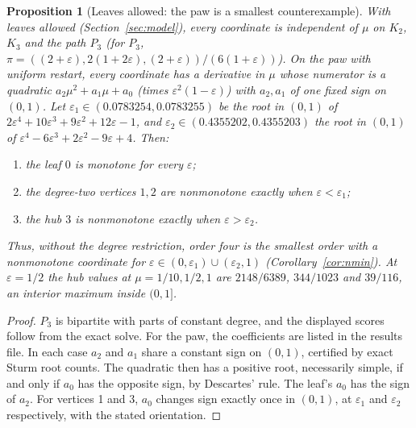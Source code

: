\documentclass[11pt,a4paper]{article}
\newtheorem{proposition}[theorem]{Proposition}
\theoremstyle{definition}\newtheorem{conjecture}{Conjecture}
\theoremstyle{remark}\newtheorem{remark}[theorem]{Remark}
\newcommand{\eps}{\varepsilon}
\begin{document}
\begin{proposition}[Leaves allowed: the paw is a smallest counterexample]\label{prop:paw}
With leaves allowed (Section~\ref{sec:model}), every coordinate is independent of $\mu$ on $K_2$, $K_3$ and the path $P_3$ (for $P_3$, $\pi=((2+\eps),2(1+2\eps),(2+\eps))/(6(1+\eps))$). On the paw with uniform restart, every coordinate has a derivative in $\mu$ whose numerator is a quadratic $a_2\mu^2+a_1\mu+a_0$ (times $\eps^2(1-\eps)$) with $a_2,a_1$ of one fixed sign on $(0,1)$. Let $\eps_1\in(0.0783254,0.0783255)$ be the root in $(0,1)$ of $2\eps^4+10\eps^3+9\eps^2+12\eps-1$, and $\eps_2\in(0.4355202,0.4355203)$ the root in $(0,1)$ of $\eps^4-6\eps^3+2\eps^2-9\eps+4$. Then:
\begin{enumerate}
 \item the leaf $0$ is monotone for every $\eps$;
 \item the degree-two vertices $1,2$ are nonmonotone exactly when $\eps<\eps_1$;
 \item the hub $3$ is nonmonotone exactly when $\eps>\eps_2$.
\end{enumerate}
Thus, without the degree restriction, order four is the smallest order with a nonmonotone coordinate for $\eps\in(0,\eps_1)\cup(\eps_2,1)$ (Corollary~\ref{cor:nmin}). At $\eps=1/2$ the hub values at $\mu=1/10,1/2,1$ are $2148/6389$, $344/1023$ and $39/116$, an interior maximum inside $(0,1]$.
\end{proposition}
\begin{proof}
$P_3$ is bipartite with parts of constant degree, and the displayed scores follow from the exact solve. For the paw, the coefficients are listed in the results file. In each case $a_2$ and $a_1$ share a constant sign on $(0,1)$, certified by exact Sturm root counts. The quadratic then has a positive root, necessarily simple, if and only if $a_0$ has the opposite sign, by Descartes' rule. The leaf's $a_0$ has the sign of $a_2$. For vertices 1 and 3, $a_0$ changes sign exactly once in $(0,1)$, at $\eps_1$ and $\eps_2$ respectively, with the stated orientation.
\end{proof}
\end{document}
